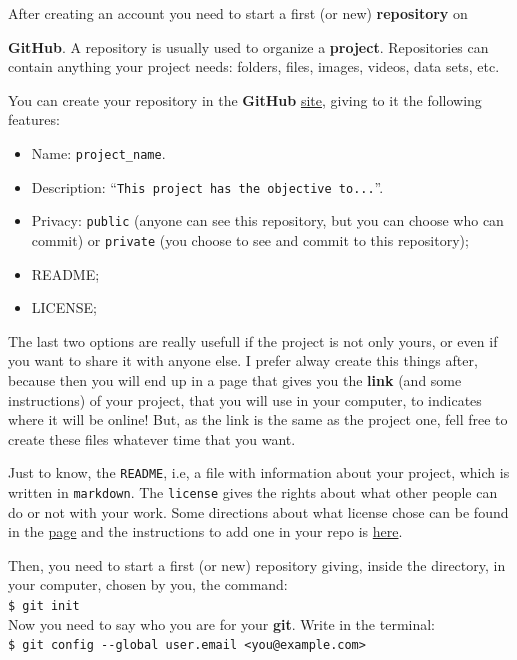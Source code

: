 \documentclass[12pt,a4paper,titlepage,brazil]{article}
\begin{document}
After creating an account you need to start a first (or new) {\bf repository} on {{\bf GitHub}. A repository is usually used to organize a {\bf project}. Repositories can contain anything your project needs: folders, files, images, videos, data sets, etc.

You can create your repository in the {\bf GitHub} \href{https://github.com}{site}, giving to it the following features:
\begin{itemize}
 \item Name: \texttt{project\_name}.
 \item Description: ``\texttt{This project has the objective to...}''.
 \item Privacy: \texttt{public} (anyone can see this repository, but you can choose who can commit) or \texttt{private} (you choose to see and commit to this repository);
 \item README;
 \item LICENSE;
\end{itemize}
The last two options are really usefull if the project is not only yours, or even if you want to share it with anyone else. I prefer alway create this things after, because then you will end up in a page that gives you the {\bf link} (and some instructions) of your project, that you will use in your computer, to indicates where it will be online! But, as the link is the same as the project one, fell free to create these files whatever time that you want.

Just to know, the \texttt{README}, i.e, a file with information about your project, which is written in \texttt{markdown}. The \texttt{license} gives the rights about what other people can do or not with your work. Some directions about what license chose can be found in the \href{https://opensource.guide/legal/#which-open-source-license-is-appropriate-for-my-project}{page} and the instructions to add one in your repo is \href{https://docs.github.com/en/github/creating-cloning-and-archiving-repositories/licensing-a-repository}{here}.

Then, you need to start a first (or new) repository giving, inside the directory, in your computer, chosen by you, the command:\\

\texttt{\$ git init}\\

Now you need to say who you are for your {\bf git}. Write in the terminal:\\

\texttt{\$ git config -\hspace{0.01cm}-global user.email <you@example.com>}

}
\end{document}
